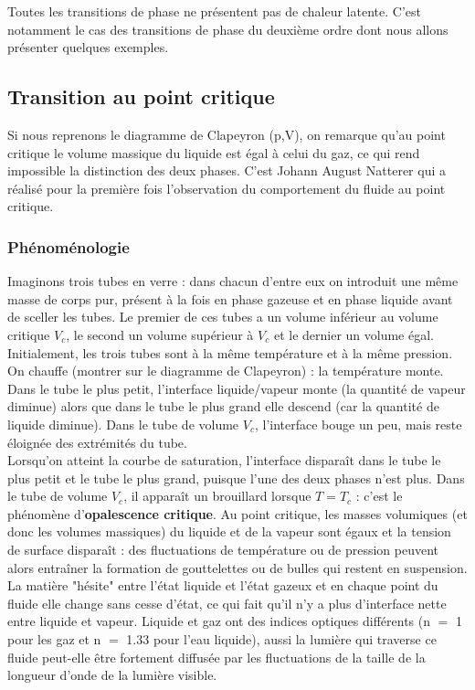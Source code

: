 \documentclass[11pt,a4paper]{report}
\begin{document}
Toutes les transitions de phase ne présentent pas de chaleur latente. C'est notamment le cas des transitions de phase du deuxième ordre dont nous allons présenter quelques exemples.

\subsection{Transition au point critique}

Si nous reprenons le diagramme de Clapeyron (p,V), on remarque qu'au point critique le volume massique du liquide est égal à celui du gaz, ce qui rend impossible la distinction des deux phases. C'est Johann August Natterer qui a réalisé pour la première fois l'observation du comportement du fluide au point critique.

\subsubsection*{Phénoménologie}

Imaginons trois tubes en verre : dans chacun d'entre eux on introduit une même masse de corps pur, présent à la fois en phase gazeuse et en phase liquide avant de sceller les tubes. Le premier de ces tubes a un volume inférieur au volume critique $V_c$, le second un volume supérieur à $V_c$ et le dernier un volume égal. Initialement, les trois tubes sont à la même température et à la même pression.\\

On chauffe (montrer sur le diagramme de Clapeyron) : la température monte. Dans le tube le plus petit, l'interface liquide/vapeur monte (la quantité de vapeur diminue) alors que dans le tube le plus grand elle descend (car la quantité de liquide diminue). Dans le tube de volume $V_c$, l'interface bouge un peu, mais reste éloignée des extrémités du tube.\\

Lorsqu'on atteint la courbe de saturation, l'interface disparaît dans le tube le plus petit et le tube le plus grand, puisque l'une des deux phases n'est plus. Dans le tube de volume $V_c$, il apparaît un brouillard lorsque $T = T_c$ : c'est le phénomène d'\textbf{opalescence critique}. Au point critique, les masses volumiques (et donc les volumes massiques) du liquide et de la vapeur sont égaux et la tension de surface disparaît : des fluctuations de température ou de pression peuvent alors entraîner la formation de gouttelettes ou de bulles qui restent en suspension. La matière "hésite" entre l'état liquide et l'état gazeux et en chaque point du fluide elle change sans cesse d'état, ce qui fait qu'il n'y a plus d'interface nette entre liquide et vapeur. Liquide et gaz ont des indices optiques différents (n $=$ 1 pour les gaz et n $=$ 1.33 pour l'eau liquide), aussi la lumière qui traverse ce fluide peut-elle être fortement diffusée par les fluctuations de la taille de la longueur d'onde de la lumière visible.
\end{document}
